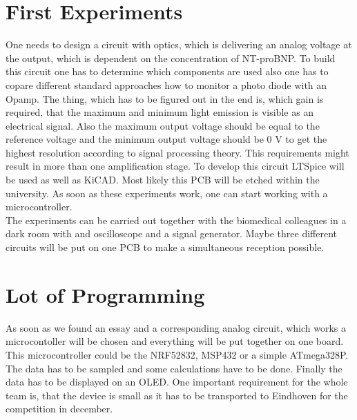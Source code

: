 \documentclass{report}
\newcommand{\newpar}{\vspace{1em}\\}
\begin{document}
\section{First Experiments}
One needs to design a circuit with optics, which is delivering an analog voltage at the output, which is dependent on the concentration of NT-proBNP. To build this circuit one has to determine which components are used also one has to copare different standard approaches how to monitor a photo diode with an Opamp. The thing, which has to be figured out in the end is, which gain is required, that the maximum and minimum light emission is visible as an electrical signal. Also the maximum output voltage should be equal to the reference voltage and the minimum output voltage should be 0 V to get the highest resolution according to signal processing theory. This requirements might result in more than one amplification stage. To develop this circuit LTSpice will be used as well as KiCAD. Most likely this PCB will be etched within the university. As soon as these experiments work, one can start working with a microcontroller. 
\newpar
The experiments can be carried out together with the biomedical colleagues in a dark room with and oscilloscope and a signal generator. Maybe three different circuits will be put on one PCB to make a simultaneous reception possible.  

\section{Lot of Programming}
As soon as we found an essay and a corresponding analog circuit, which works a microcontoller will be chosen and everything will be put together on one board. This microcontroller could be the NRF52832, MSP432 or a simple ATmega328P. The data has to be sampled and some calculations have to be done. Finally the data has to be displayed on an OLED. One important requirement for the whole team is, that the device is small as it has to be transported to Eindhoven for the competition in december.   

\end{document}
